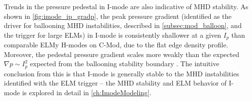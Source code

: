 Trends in the pressure pedestal in I-mode are also indicative of MHD stability.  As shown in \cref{fig:imode_ip_gradp}, the peak pressure gradient (identified as the driver for ballooning MHD instabilities, described in \cref{subsec:mod_balloon}, and the trigger for large ELMs) in I-mode is consistently shallower at a given $I_p$ than comparable ELMy H-modes on C-Mod, due to the flat edge density profile.  Moreover, the pedestal pressure gradient scales more weakly than the expected $\nabla p \sim I_p^2$ expected from the ballooning stability boundary \cite{Connor1978}.  The intuitive conclusion from this is that I-mode is generally stable to the MHD instabilities identified with the ELM trigger -- the MHD stability and ELM behavior of I-mode is explored in detail in \cref{ch:ImodeModeling}.

\begin{figure}
 \pushtooutside
\end{figure}

